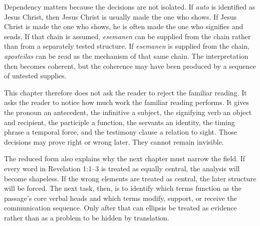Dependency matters because the decisions are not isolated. If \textit{auto} is identified as Jesus Christ, then Jesus Christ is usually made the one who shows. If Jesus Christ is made the one who shows, he is often made the one who signifies and sends. If that chain is assumed, \textit{esemanen} can be supplied from the chain rather than from a separately tested structure. If \textit{esemanen} is supplied from the chain, \textit{aposteilas} can be read as the mechanism of that same chain. The interpretation then becomes coherent, but the coherence may have been produced by a sequence of untested supplies.

This chapter therefore does not ask the reader to reject the familiar reading. It asks the reader to notice how much work the familiar reading performs. It gives the pronoun an antecedent, the infinitive a subject, the signifying verb an object and recipient, the participle a function, the servants an identity, the timing phrase a temporal force, and the testimony clause a relation to sight. Those decisions may prove right or wrong later. They cannot remain invisible.

The reduced form also explains why the next chapter must narrow the field. If every word in Revelation 1:1--3 is treated as equally central, the analysis will become shapeless. If the wrong elements are treated as central, the later structure will be forced. The next task, then, is to identify which terms function as the passage's core verbal heads and which terms modify, support, or receive the communication sequence. Only after that can ellipsis be treated as evidence rather than as a problem to be hidden by translation.
